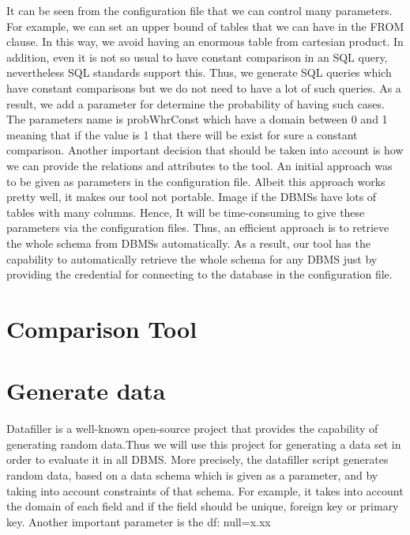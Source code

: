 It can be seen from the configuration file that we can control many parameters. For example, we can set an upper bound of tables that we can have in the FROM clause. In this way, we avoid having an enormous table from cartesian product. In addition, even it is not so usual to have constant comparison in an SQL query, nevertheless SQL standards support this. Thus, we generate SQL queries which have constant comparisons but we do not need to have a lot of such queries. As a result, we add a parameter for determine the probability of having such cases. The parameters name is probWhrConst which have a domain between 0 and 1 meaning that if the value is 1 that there will be exist for sure a constant comparison.
Another important decision that should be taken into account is how we can provide the relations and attributes to the tool. An initial approach was to be given as parameters in the configuration file. Albeit this approach works pretty well, it makes our tool not portable. Image if the DBMSs have lots of tables with many columns. Hence, It will be time-consuming to give these parameters via the configuration files. Thus, an efficient approach is to retrieve the whole schema from DBMSs automatically. As a result, our tool has the capability to automatically retrieve the whole schema for any DBMS just by providing the credential for connecting to the database in the configuration file.    


\section{Comparison Tool} 


\section{Generate data}
Datafiller is a well-known open-source project that provides the capability of generating random data.Thus we will use this project for generating a data set in order to evaluate it in all DBMS. More precisely, the datafiller script generates random data, based on a data schema which is given as a parameter, and by taking into account constraints of that schema. For example, it takes into account the domain of each field and if the field should be unique, foreign key or primary key. Another important parameter is the df: null=x.xx%
 
